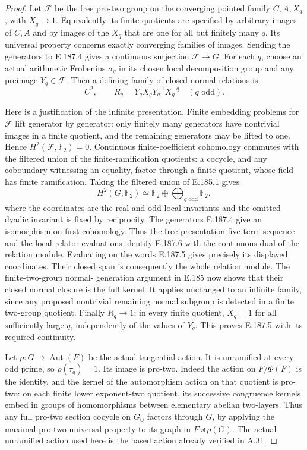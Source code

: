 \begin{proof}
Let \(\mathcal F\) be the free pro-two group on the
converging pointed family \(C,A,X_q\), with
\(X_q\to1\). Equivalently its finite quotients are
specified by arbitrary images of \(C,A\) and by images
of the \(X_q\) that are one for all but finitely many
\(q\). Its universal property concerns exactly converging
families of images. Sending the generators to E.187.4
gives a continuous surjection \(\mathcal F\to G\).
For each \(q\), choose an actual arithmetic Frobenius
\(\sigma_q\) in its chosen local decomposition group
and any preimage \(Y_q\in\mathcal F\). Then a defining
family of closed normal relations is
\[
       C^2,\qquad R_q=Y_qX_qY_q^{-1}X_q^{-q}
                                    \quad(q\text{ odd}).
 \tag{E.187.5}
\]

Here is a justification of the infinite presentation.
Finite embedding problems for \(\mathcal F\) lift
generator by generator: only finitely many generators
have nontrivial images in a finite quotient, and the
remaining generators may be lifted to one. Hence
\(H^2(\mathcal F,\mathbb F_2)=0\).
Continuous finite-coefficient cohomology commutes with
the filtered union of the finite-ramification quotients:
a cocycle, and any coboundary witnessing an equality,
factor through a finite quotient, whose field has finite
ramification. Taking the filtered union of E.185.1 gives
\[
 H^2(G,\mathbb F_2)
       \simeq\mathbb F_2\oplus
                 \bigoplus_{q\text{ odd}}\mathbb F_2,
 \tag{E.187.6}
\]
where the coordinates are the real and odd local invariants
and the omitted dyadic invariant is fixed by reciprocity.
The generators E.187.4 give an isomorphism on first
cohomology. Thus the free-presentation five-term sequence
and the local relator evaluations identify E.187.6 with
the continuous dual of the relation module. Evaluating
on the words E.187.5 gives precisely its displayed
coordinates. Their closed span is consequently the
whole relation module. The finite-two-group normal-
generation argument in E.185 now shows that their closed
normal closure is the full kernel. It applies unchanged
to an infinite family, since any proposed nontrivial
remaining normal subgroup is detected in a finite
two-group quotient. Finally \(R_q\to1\): in every
finite quotient, \(X_q=1\) for all sufficiently large
\(q\), independently of the values of \(Y_q\).
This proves E.187.5 with its required continuity.

Let \(\rho:G\to\operatorname{Aut}(F)\) be the actual
tangential action. It is unramified at every odd prime,
so \(\rho(\tau_q)=1\). Its image is pro-two. Indeed
the action on \(F/\Phi(F)\) is the identity, and the
kernel of the automorphism action on that quotient is
pro-two: on each finite lower exponent-two quotient,
its successive congruence kernels embed in groups of
homomorphisms between elementary abelian two-layers.
Thus any full pro-two section cocycle on \(G_{\mathbb Q}\)
factors through \(G\), by applying the maximal-pro-two
universal property to its graph in
\(F\rtimes\rho(G)\). The actual unramified action used
here is the based action already verified in A.31.


\end{proof}
